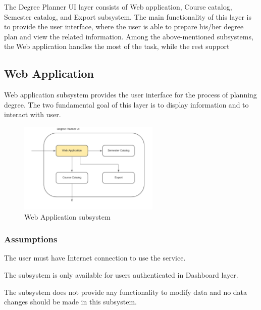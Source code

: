 The Degree Planner UI layer consists of Web application, Course catalog, Semester catalog, and Export subsystem. The main functionality of this layer is to provide the user interface, where the user is able to prepare his/her degree plan and view the related information. Among the above-mentioned subsystems, the Web application handles the most of the task, while the rest support

\subsection{Web Application}
Web application subsystem provides the user interface for the process of planning degree. The two fundamental goal of this layer is to display information and to interact with user.

\begin{figure}[h!]
	\centering
 	\includegraphics[width=0.60\textwidth]{images/WebApplication}
 \caption{Web Application subsystem}
\end{figure}

\subsubsection{Assumptions}
\begin{itemize}
\begin{item}
The user must have Internet connection to use the service.
\end{item}
\begin{item}
The subsystem is only available for users authenticated in Dashboard layer.
\end{item}
\begin{item}
The subsystem does not provide any functionality to modify data and no data changes should be made in this subsystem.
\end{item}
\end{itemize}

